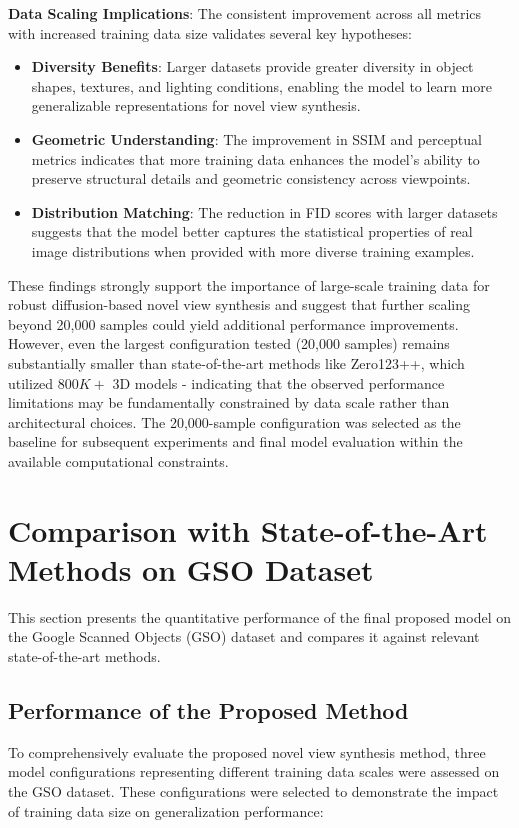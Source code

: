 \textbf{Data Scaling Implications}:
The consistent improvement across all metrics with increased training data size validates several key hypotheses:
\begin{itemize}
  \item \textbf{Diversity Benefits}: Larger datasets provide greater diversity in object shapes, textures, and lighting conditions, enabling the model to learn more generalizable representations for novel view synthesis.
  \item \textbf{Geometric Understanding}: The improvement in SSIM and perceptual metrics indicates that more training data enhances the model's ability to preserve structural details and geometric consistency across viewpoints.
  \item \textbf{Distribution Matching}: The reduction in FID scores with larger datasets suggests that the model better captures the statistical properties of real image distributions when provided with more diverse training examples.
\end{itemize}

These findings strongly support the importance of large-scale training data for robust diffusion-based novel view synthesis and suggest that further scaling beyond 20,000 samples could yield additional performance improvements. However, even the largest configuration tested (20,000 samples) remains substantially smaller than state-of-the-art methods like Zero123++, which utilized $800K+$ 3D models - indicating that the observed performance limitations may be fundamentally constrained by data scale rather than architectural choices. The 20,000-sample configuration was selected as the baseline for subsequent experiments and final model evaluation within the available computational constraints.

\section{Comparison with State-of-the-Art Methods on GSO Dataset}\label{sec:exp_gso_quantitative_sota}

This section presents the quantitative performance of the final proposed model on the Google Scanned Objects (GSO) dataset and compares it against relevant state-of-the-art methods.

\subsection{Performance of the Proposed Method}\label{ssec:exp_gso_our_model}
To comprehensively evaluate the proposed novel view synthesis method, three model configurations representing different training data scales were assessed on the GSO dataset. These configurations were selected to demonstrate the impact of training data size on generalization performance:

